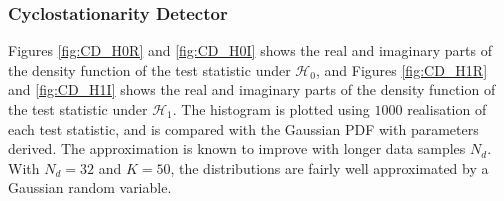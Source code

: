 \documentclass[11pt]{article}
\newcommand{\cH}{\mathcal{H}}
\begin{document}

\subsubsection*{Cyclostationarity Detector}
\label{subsubsec:cyclostationarityDetectorImplementation}

\noindent {}

Figures \ref{fig:CD_H0R} and \ref{fig:CD_H0I} shows the real and imaginary parts of the density function of the test statistic under $\cH_{0}$, and Figures \ref{fig:CD_H1R} and \ref{fig:CD_H1I} shows the real and imaginary parts of the density function of the test statistic under $\cH_{1}$. The histogram is plotted using $1000$ realisation of each test statistic, and is compared with the Gaussian PDF with parameters derived. The approximation is known to improve with longer data samples $N_{d}$. With $N_{d}=32$ and $K=50$, the distributions are fairly well approximated by a Gaussian random variable.
\end{document}
